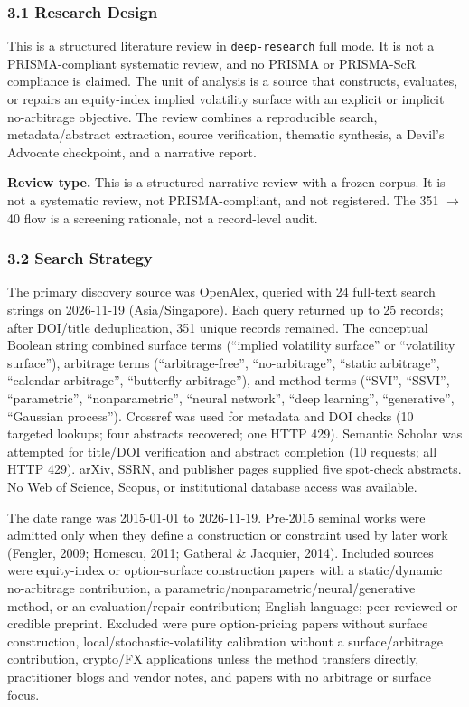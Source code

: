 \documentclass[11pt]{article}
\begin{document}
\subsubsection*{3.1 Research Design}
This is a structured literature review in \texttt{deep-research} full mode. It is not a PRISMA-compliant systematic review, and no PRISMA or PRISMA-ScR compliance is claimed. The unit of analysis is a source that constructs, evaluates, or repairs an equity-index implied volatility surface with an explicit or implicit no-arbitrage objective. The review combines a reproducible search, metadata/abstract extraction, source verification, thematic synthesis, a Devil’s Advocate checkpoint, and a narrative report.

\textbf{Review type.} This is a structured narrative review with a frozen corpus. It is not a systematic review, not PRISMA-compliant, and not registered. The 351 $\rightarrow$ 40 flow is a screening rationale, not a record-level audit.

\subsubsection*{3.2 Search Strategy}
The primary discovery source was OpenAlex, queried with 24 full-text search strings on 2026-11-19 (Asia/Singapore). Each query returned up to 25 records; after DOI/title deduplication, 351 unique records remained. The conceptual Boolean string combined surface terms (“implied volatility surface” or “volatility surface”), arbitrage terms (“arbitrage-free”, “no-arbitrage”, “static arbitrage”, “calendar arbitrage”, “butterfly arbitrage”), and method terms (“SVI”, “SSVI”, “parametric”, “nonparametric”, “neural network”, “deep learning”, “generative”, “Gaussian process”). Crossref was used for metadata and DOI checks (10 targeted lookups; four abstracts recovered; one HTTP 429). Semantic Scholar was attempted for title/DOI verification and abstract completion (10 requests; all HTTP 429). arXiv, SSRN, and publisher pages supplied five spot-check abstracts. No Web of Science, Scopus, or institutional database access was available.

The date range was 2015-01-01 to 2026-11-19. Pre-2015 seminal works were admitted only when they define a construction or constraint used by later work (Fengler, 2009; Homescu, 2011; Gatheral \& Jacquier, 2014). Included sources were equity-index or option-surface construction papers with a static/dynamic no-arbitrage contribution, a parametric/nonparametric/neural/generative method, or an evaluation/repair contribution; English-language; peer-reviewed or credible preprint. Excluded were pure option-pricing papers without surface construction, local/stochastic-volatility calibration without a surface/arbitrage contribution, crypto/FX applications unless the method transfers directly, practitioner blogs and vendor notes, and papers with no arbitrage or surface focus.
\end{document}
